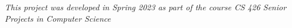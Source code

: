\documentclass[final]{beamer}
\newlength{\sepwidth}
\newlength{\colwidth}
\newcommand{\separatorcolumn}{\begin{column}{\sepwidth}\end{column}}
\begin{document}
\begin{frame}[t]
\begin{columns}[t]
\begin{column}{\colwidth}
  \begin{block}{}
    
    \it{This project was developed in Spring 2023 as part of the course CS 426 Senior Projects in Computer Science}

  \end{block}

\end{column}

\separatorcolumn
\end{columns}
\end{frame}
\end{document}
